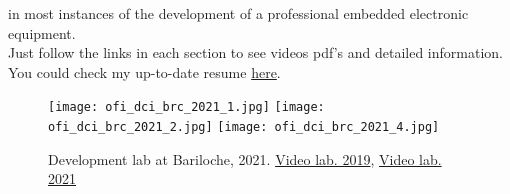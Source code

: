 in most instances of the development of a professional embedded electronic equipment.\\
Just follow the links in each section to see videos pdf's and detailed information.\\
You could check my up-to-date resume \href{\linkgithubcvpdf}{here}.\\
  \begin{figure}
      \begin{center}
         \texttt{[image: ofi\_dci\_brc\_2021\_1.jpg]}
         \texttt{[image: ofi\_dci\_brc\_2021\_2.jpg]}
         \texttt{[image: ofi\_dci\_brc\_2021\_4.jpg]}
      \end{center}
      \caption{Development lab at Bariloche, 2021. \href{\linkofidci}{Video lab. 2019}, \href{\linkofidcitwentyone}{Video lab. 2021}}
      \label{fig:ofi_dci}
   \end{figure}
\pagebreak
